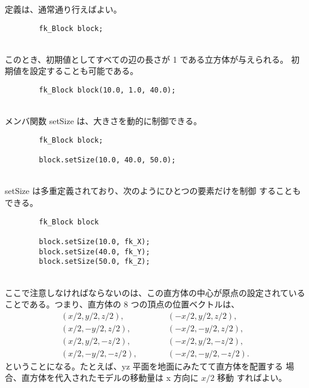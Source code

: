 定義は、通常通り行えばよい。
\\
\begin{screen}
\begin{verbatim}
        fk_Block block;
\end{verbatim}
\end{screen}
~ \\
このとき、初期値としてすべての辺の長さが 1 である立方体が与えられる。
初期値を設定することも可能である。
\\
\begin{screen}
\begin{verbatim}
        fk_Block block(10.0, 1.0, 40.0);
\end{verbatim}
\end{screen}
~ \\
メンバ関数 setSize は、大きさを動的に制御できる。
\\
\begin{screen}
\begin{verbatim}
        fk_Block block;

        block.setSize(10.0, 40.0, 50.0);
\end{verbatim}
\end{screen}
~ \\
setSize は多重定義されており、次のようにひとつの要素だけを制御
することもできる。
\\
\begin{breakbox}
\begin{verbatim}
        fk_Block block

        block.setSize(10.0, fk_X);
        block.setSize(40.0, fk_Y);
        block.setSize(50.0, fk_Z);
\end{verbatim}
\end{breakbox}
~ \\
ここで注意しなければならないのは、この直方体の中心が原点の設定されている
ことである。つまり、直方体の 8 つの頂点の位置ベクトルは、
\begin{eqnarray*}
        (x/2, y/2, z/2), & \qquad & (-x/2, y/2, z/2), \\
        (x/2, -y/2, z/2), & \qquad & (-x/2, -y/2, z/2), \\
        (x/2, y/2, -z/2), & \qquad & (-x/2, y/2, -z/2), \\
        (x/2, -y/2, -z/2), & \qquad & (-x/2, -y/2, -z/2).
\end{eqnarray*}
ということになる。たとえば、yz 平面を地面にみたてて直方体を配置する
場合、直方体を代入されたモデルの移動量は x 方向に \(x/2\) 移動
すればよい。


